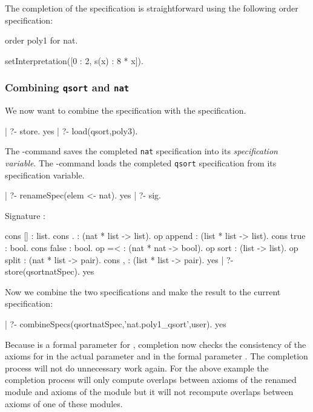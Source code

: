 The completion of the  specification is straightforward using
the following order specification:

\begin{spec}
order poly1 for nat. 

setInterpretation([0 : 2,
                   s(x) : 8 * x]).
\end{spec}

\subsubsection{Combining {\tt qsort} and {\tt nat}}

We now want to combine the  specification with the 
 specification.

\begin{screen}
| ?- store.
yes
| ?- load(qsort,poly3).
\end{screen}

\noindent
The -command saves the completed {\tt nat} specification
into its {\em specification variable}.
The -command loads the completed {\tt qsort} specification
from its specification variable.

\begin{screen}
| ?- renameSpec(elem <- nat).
yes
| ?- sig.

Signature :

cons [] : list.
cons .  : (nat * list -> list).
op append       : (list * list -> list).
cons true       : bool.
cons false      : bool.
op =<   : (nat * nat -> bool).
op sort	: (list -> list).
op split        : (nat * list -> pair).
cons ,    : (list * list -> pair).
yes
| ?- store(qsortnatSpec).
yes
\end{screen}

\noindent
Now we combine the two specifications and make the result 
to the current specification:

\begin{screen}
| ?- combineSpecs(qsortnatSpec,'nat.poly1_qsort',user).
yes
\end{screen}

\noindent
Because  is a formal parameter for ,
completion now checks the consistency of the axioms for
\cec{=<} in the actual parameter  and in the formal
parameter .
The completion process will not do unnecessary work again. 
For the above example the completion process
will only compute overlaps between axioms
of the renamed module  and axioms of the module 
but it will not recompute overlaps between axioms of one of these
modules.

